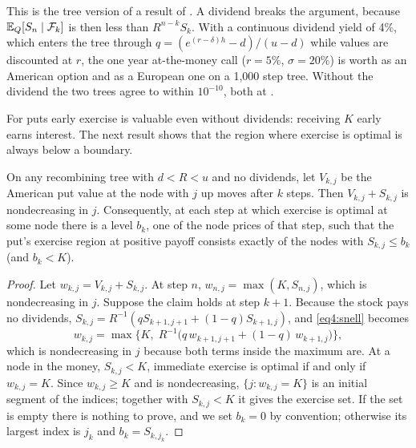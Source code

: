 \begin{chapterrefs}
This is the tree version of a result of \textcite{merton1973}. A dividend breaks the argument, because
$\mathbb{E}_Q[S_n\mid\mathcal F_k]$ is then less than $R^{n-k}S_k$. With a continuous dividend yield of 4\%,
which enters the tree through $q=(e^{(r-\delta)h}-d)/(u-d)$ while values are discounted at $r$, the one
year at-the-money call ($r=5\%$, $\sigma=20\%$) is worth \amCallDiv{} as an American option and \euCallDiv{} as a European one on a
1,000 step tree. Without the dividend the two trees agree to within $10^{-10}$, both at \amCallNoDiv.

For puts early exercise is valuable even without dividends: receiving $K$ early earns interest. The
next result shows that the region where exercise is optimal is always below a boundary.

\begin{proposition}\label{prop4:boundary}
On any recombining tree with $d<R<u$ and no dividends, let $V_{k,j}$ be the American put value at the
node with $j$ up moves after $k$ steps. Then $V_{k,j}+S_{k,j}$ is nondecreasing in $j$. Consequently,
at each step at which exercise is optimal at some node there is a level $b_k$, one of the node prices of that step, such that the put's exercise region at positive payoff consists
exactly of the nodes with $S_{k,j}\le b_k$ (and $b_k<K$).
\end{proposition}

\begin{proof}
Let $w_{k,j}=V_{k,j}+S_{k,j}$. At step $n$, $w_{n,j}=\max(K,S_{n,j})$, which is nondecreasing in $j$.
Suppose the claim holds at step $k+1$. Because the stock pays no dividends,
$S_{k,j}=R^{-1}(qS_{k+1,j+1}+(1-q)S_{k+1,j})$, and \cref{eq4:snell} becomes
\begin{equation*}
  w_{k,j}=\max\bigl\{K,\;R^{-1}\bigl(q\,w_{k+1,j+1}+(1-q)\,w_{k+1,j}\bigr)\bigr\},
\end{equation*}
which is nondecreasing in $j$ because both terms inside the maximum are. At a node in the money,
$S_{k,j}<K$, immediate exercise is optimal if and only if $w_{k,j}=K$. Since $w_{k,j}\ge K$ and is
nondecreasing, $\{j:w_{k,j}=K\}$ is an initial segment of the indices; together with $S_{k,j}<K$ it gives the exercise set. If the set is
empty there is nothing to prove, and we set $b_k=0$ by convention; otherwise its largest index is
$j_k$ and $b_k=S_{k,j_k}$.
\end{proof}


\end{chapterrefs}
